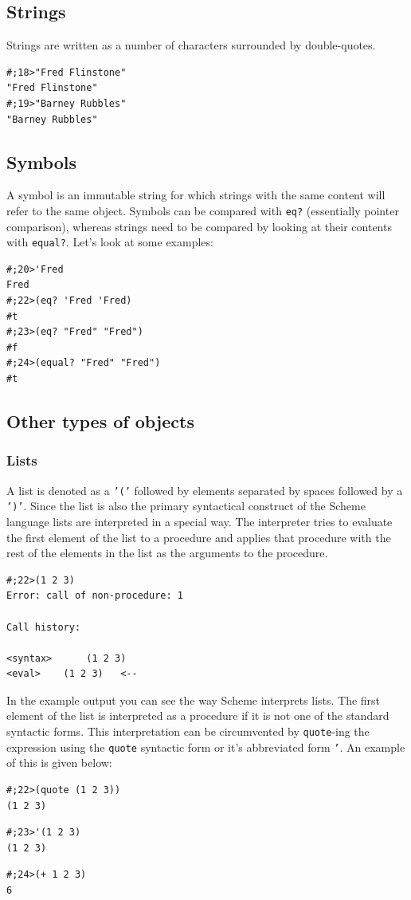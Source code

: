 \documentclass[12pt,a4paper,english,twoside]{article}
\begin{document}
\subsection{Strings}
Strings are written as a number of characters surrounded by double-quotes.
\begin{lstlisting}
#;18>"Fred Flinstone"
"Fred Flinstone"    
#;19>"Barney Rubbles"
"Barney Rubbles"
\end{lstlisting}
\subsection{Symbols}
A symbol is an immutable string for which strings with the same content 
will refer to the same object. Symbols can be compared with 
\texttt{eq?} (essentially pointer comparison), whereas strings need to be 
compared by looking at their contents with \texttt{equal?}. Let's look at some 
examples:
\begin{lstlisting}
#;20>'Fred
Fred
#;22>(eq? 'Fred 'Fred)
#t
#;23>(eq? "Fred" "Fred")
#f
#;24>(equal? "Fred" "Fred")
#t
\end{lstlisting}
\subsection{Other types of objects}
\subsubsection{Lists}
A list is denoted as a \texttt{'('} followed by elements separated by spaces 
followed by a \texttt{')'}. Since the list is also the primary syntactical 
construct of the Scheme language lists are interpreted in a special way. The 
interpreter tries to evaluate the first element of the list to a procedure and 
applies that procedure with the rest of the elements in the list as the 
arguments to the procedure.
\begin{lstlisting}
#;22>(1 2 3)
Error: call of non-procedure: 1

Call history:

<syntax>	  (1 2 3)
<eval>	  (1 2 3)	<--

\end{lstlisting}
In the example output you can see the way Scheme interprets lists. The first 
element of the list is interpreted as a procedure if it is not one of the 
standard syntactic forms. This interpretation can be circumvented by 
\texttt{quote}-ing the expression using the \texttt{quote} syntactic form or 
it's abbreviated form \texttt{'}. An example of this is given below:
\begin{lstlisting}
#;22>(quote (1 2 3))
(1 2 3)
\end{lstlisting}
\begin{lstlisting}
#;23>'(1 2 3)
(1 2 3)
\end{lstlisting}
\begin{lstlisting}
#;24>(+ 1 2 3)
6
\end{lstlisting}
\end{document}
